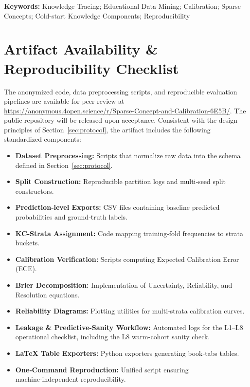 \documentclass[12pt,a4paper]{jedm}
\begin{document}
\vspace{10pt}
\noindent\textbf{Keywords:} Knowledge Tracing; Educational Data Mining; Calibration; Sparse Concepts; Cold-start Knowledge Components; Reproducibility








\section*{Artifact Availability \& Reproducibility Checklist}
\begin{sloppypar}
The anonymized code, data preprocessing scripts, and reproducible evaluation pipelines are available for peer review at \url{https://anonymous.4open.science/r/Sparse-Concept-and-Calibration-6E5B/}. The public repository will be released upon acceptance. Consistent with the design principles of Section~\ref{sec:protocol}, the artifact includes the following standardized components:
\end{sloppypar}
\begin{itemize}
  \item \textbf{Dataset Preprocessing:} Scripts that normalize raw data into the schema defined in Section~\ref{sec:protocol}.
  \item \textbf{Split Construction:} Reproducible partition logs and multi‑seed split constructors.
  \item \textbf{Prediction‑level Exports:} CSV files containing baseline predicted probabilities and ground‑truth labels.
  \item \textbf{KC‑Strata Assignment:} Code mapping training‑fold frequencies to strata buckets.
  \item \textbf{Calibration Verification:} Scripts computing Expected Calibration Error (ECE).
  \item \textbf{Brier Decomposition:} Implementation of Uncertainty, Reliability, and Resolution equations.
  \item \textbf{Reliability Diagrams:} Plotting utilities for multi‑strata calibration curves.
  \item \textbf{Leakage \& Predictive-Sanity Workflow:} Automated logs for the L1--L8 operational checklist, including the L8 warm-cohort sanity check.
  \item \textbf{LaTeX Table Exporters:} Python exporters generating book‑tabs tables.
  \item \textbf{One‑Command Reproduction:} Unified script ensuring machine‑independent reproducibility.
\end{itemize}
\end{document}
